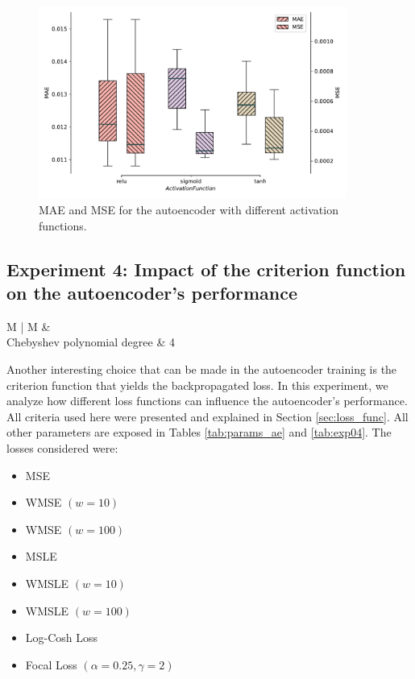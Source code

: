 \begin{figure}[!ht]
\noindent\hspace{0.5mm}\includegraphics[width=0.9\textwidth]{./figures/exp03/boxplot.pdf}
\caption{\gls{MAE} and \gls{MSE} for the autoencoder with different activation functions.}
\label{fig:exp03boxplot}
\end{figure}


\subsection{Experiment 4: Impact of the criterion function on the autoencoder's performance} \label{ssec:exp4}


\begin{table}[!ht]
\begin{tabularx}{\textwidth}{ M | M }
%
&  \\ \hline
Chebyshev polynomial degree  & 4                            \\ \hline
\end{tabularx}
\caption{Specific parameters for Experiment 4}
\label{tab:exp04}
\end{table}

Another interesting choice that can be made in the autoencoder training is the criterion function that yields the backpropagated loss. In this experiment, we analyze how different loss functions can influence the autoencoder's performance. All criteria used here were presented and explained in Section \ref{sec:loss_func}. All other parameters are exposed in Tables \ref{tab:params_ae} and \ref{tab:exp04}. The losses considered were:

\begin{itemize}
	\item \gls{MSE}
	\item \gls{WMSE} $(w=10)$
	\item \gls{WMSE} $(w=100)$
	\item \gls{MSLE}
	\item \gls{WMSLE} $(w=10)$
	\item \gls{WMSLE} $(w=100)$
	\item Log-Cosh Loss
	\item Focal Loss $(\alpha=0.25, \gamma=2)$
\end{itemize}

